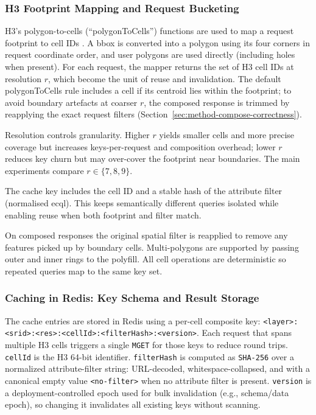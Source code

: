 \subsubsection{H3 Footprint Mapping and Request Bucketing}
\label{sec:method-h3-mapping}
H3’s polygon-to-cells (“polygonToCells”) functions are used to map a request footprint to cell IDs \cite{H3_API_Regions}. A \ac{bbox} is converted into a polygon using its four corners in request coordinate order, and user polygons are used directly (including holes when present). For each request, the mapper returns the set of H3 cell IDs at resolution $r$, which become the unit of reuse and invalidation. The default polygonToCells rule includes a cell if its centroid lies within the footprint; to avoid boundary artefacts at coarser $r$, the composed response is trimmed by reapplying the exact request filters (Section~\ref{sec:method-compose-correctness}).

Resolution controls granularity. Higher $r$ yields smaller cells and more precise coverage but increases keys-per-request and composition overhead; lower $r$ reduces key churn but may over-cover the footprint near boundaries. The main experiments compare $r\in\{7,8,9\}$.

The cache key includes the cell ID and a stable hash of the attribute filter (normalised \ac{ecql}). This keeps semantically different queries isolated while enabling reuse when both footprint and filter match.

On composed responses the original spatial filter is reapplied to remove any features picked up by boundary cells. Multi-polygons are supported by passing outer and inner rings to the polyfill. All cell operations are deterministic so repeated queries map to the same key set.

\subsubsection{Caching in Redis: Key Schema and Result Storage}
\label{sec:method-redis-keys}
The cache entries are stored in Redis using a per-cell composite key:
\texttt{<layer>:\allowbreak<srid>:\allowbreak<res>:\allowbreak<cellId>:\allowbreak<filterHash>:\allowbreak<version>}. Each request that spans multiple H3 cells triggers a single \texttt{MGET} for those keys to reduce round trips. \texttt{cellId} is the H3 64-bit identifier. \texttt{filterHash} is computed as \texttt{SHA-256} over a normalized attribute-filter string: URL-decoded, whitespace-collapsed, and with a canonical empty value \texttt{<no-filter>} when no attribute filter is present. \texttt{version} is a deployment-controlled epoch used for bulk invalidation (e.g., schema/data epoch), so changing it invalidates all existing keys without scanning.

